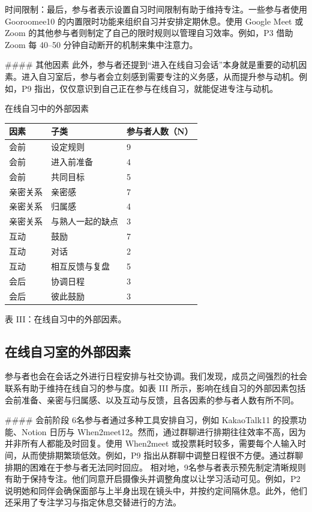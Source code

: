 \documentclass[12pt]{ctexart}
\begin{document}
时间限制：最后，参与者表示设置自习时间限制有助于维持专注。一些参与者使用 Gooroomee10 的内置限时功能来组织自习并安排定期休息。使用 Google Meet 或 Zoom 的其他参与者则制定了自己的限时规则以管理自习效率。例如，P3 借助 Zoom 每 40–50 分钟自动断开的机制来集中注意力。

\#\#\#\# 其他因素
此外，参与者还提到“进入在线自习会话”本身就是重要的动机因素。进入自习室后，参与者会立刻感到需要专注的义务感，从而提升参与动机。例如，P9 指出，仅仅意识到自己正在参与在线自习，就能促进专注与动机。

在线自习中的外部因素
\begin{table}[H]
\centering
\small
\begin{tabular}{lll}
\toprule
因素 & 子类 & 参与者人数（N） \\
\midrule
会前 & 设定规则 & 9 \\
会前 & 进入前准备 & 4 \\
会前 & 共同目标 & 5 \\
亲密关系 & 亲密感 & 7 \\
亲密关系 & 归属感 & 4 \\
亲密关系 & 与熟人一起的缺点 & 3 \\
互动 & 鼓励 & 7 \\
互动 & 对话 & 2 \\
互动 & 相互反馈与复盘 & 5 \\
会后 & 协调日程 & 3 \\
会后 & 彼此鼓励 & 3 \\
\bottomrule
\end{tabular}
\end{table}
表 III：在线自习中的外部因素。

\subsection{在线自习室的外部因素}
参与者也会在会话之外进行日程安排与社交协调。我们发现，成员之间强烈的社会联系有助于维持在线自习的参与度。如表 III 所示，影响在线自习的外部因素包括会前准备、亲密与归属感、以及互动与反馈，且各因素的参与者人数有所不同。

\#\#\#\# 会前阶段
6名参与者通过多种工具安排自习，例如 KakaoTalk11 的投票功能、Notion 日历与 When2meet12。然而，通过群聊进行排期往往效率不高，因为并非所有人都能及时回复。使用 When2meet 或投票耗时较多，需要每个人输入时间，从而使排期繁琐低效。例如，P9 指出从群聊中调整日程很不方便。通过群聊排期的困难在于参与者无法同时回应。
相对地，9名参与者表示预先制定清晰规则有助于保持专注。他们同意开启摄像头并调整角度以让学习活动可见。例如，P2 说明她和同伴会确保面部与上半身出现在镜头中，并按约定间隔休息。此外，他们还采用了专注学习与指定休息交替进行的方法。
\end{document}

